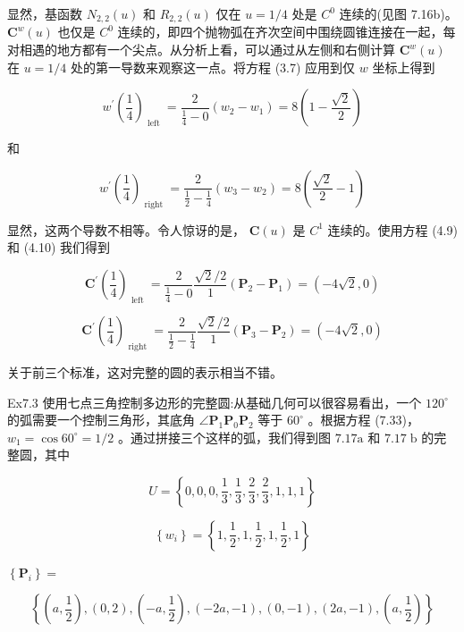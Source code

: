 \documentclass[../main.tex]{subfiles}
\begin{document}
显然，基函数 \({N}_{2,2}\left( u\right)\) 和 \({R}_{2,2}\left( u\right)\) 仅在 \(u = 1/4\) 处是 \({C}^{0}\) 连续的(见图 7.16b)。 \({\mathbf{C}}^{w}\left( u\right)\) 也仅是 \({C}^{0}\) 连续的，即四个抛物弧在齐次空间中围绕圆锥连接在一起，每对相遇的地方都有一个尖点。从分析上看，可以通过从左侧和右侧计算 \({\mathbf{C}}^{w}\left( u\right)\) 在 \(u = 1/4\) 处的第一导数来观察这一点。将方程 (3.7) 应用到仅 \(w\) 坐标上得到

\[
{w}^{\prime }{\left( \frac{1}{4}\right) }_{\text{ left }} = \frac{2}{\frac{1}{4} - 0}\left( {{w}_{2} - {w}_{1}}\right)  = 8\left( {1 - \frac{\sqrt{2}}{2}}\right)
\]

和

\[
{w}^{\prime }{\left( \frac{1}{4}\right) }_{\text{ right }} = \frac{2}{\frac{1}{2} - \frac{1}{4}}\left( {{w}_{3} - {w}_{2}}\right)  = 8\left( {\frac{\sqrt{2}}{2} - 1}\right)
\]

显然，这两个导数不相等。令人惊讶的是， \(\mathbf{C}\left( u\right)\) 是 \({C}^{1}\) 连续的。使用方程 (4.9) 和 (4.10) 我们得到

\[
{\mathbf{C}}^{\prime }{\left( \frac{1}{4}\right) }_{\text{ left }} = \frac{2}{\frac{1}{4} - 0}\frac{\sqrt{2}/2}{1}\left( {{\mathbf{P}}_{2} - {\mathbf{P}}_{1}}\right)  = \left( {-4\sqrt{2},0}\right)
\]

\[
{\mathbf{C}}^{\prime }{\left( \frac{1}{4}\right) }_{\text{ right }} = \frac{2}{\frac{1}{2} - \frac{1}{4}}\frac{\sqrt{2}/2}{1}\left( {{\mathbf{P}}_{3} - {\mathbf{P}}_{2}}\right)  = \left( {-4\sqrt{2},0}\right)
\]

关于前三个标准，这对完整的圆的表示相当不错。

Ex7.3 使用七点三角控制多边形的完整圆:从基础几何可以很容易看出，一个 \({120}^{ \circ  }\) 的弧需要一个控制三角形，其底角 \(\angle {\mathbf{P}}_{1}{\mathbf{P}}_{0}{\mathbf{P}}_{2}\) 等于 \({60}^{ \circ  }\) 。根据方程 (7.33)， \({w}_{1} = \cos {60}^{ \circ  } = 1/2\) 。通过拼接三个这样的弧，我们得到图 \({7.17}\mathrm{a}\) 和 \({7.17}\mathrm{\;b}\) 的完整圆，其中

\[
U = \left\{  {0,0,0,\frac{1}{3},\frac{1}{3},\frac{2}{3},\frac{2}{3},1,1,1}\right\}
\]

\[
\left\{  {w}_{i}\right\}   = \left\{  {1,\frac{1}{2},1,\frac{1}{2},1,\frac{1}{2},1}\right\}
\]





\(\left\{  {\mathbf{P}}_{i}\right\}   =\)

\[
\left\{  {\left( {a,\frac{1}{2}}\right) ,\left( {0,2}\right) ,\left( { - a,\frac{1}{2}}\right) ,\left( { - {2a}, - 1}\right) ,\left( {0, - 1}\right) ,\left( {{2a}, - 1}\right) ,\left( {a,\frac{1}{2}}\right) }\right\}
\]
\end{document}
